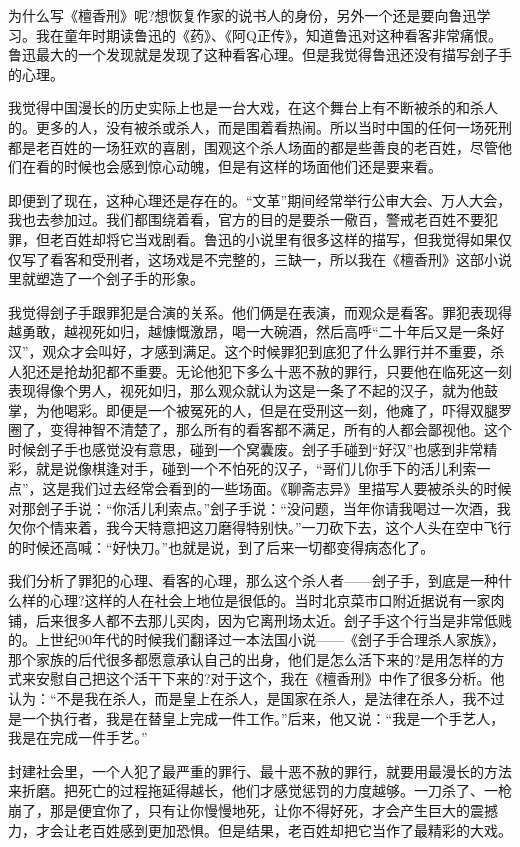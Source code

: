 \documentclass[fontset=fandol,12pt,a5paper]{ctexbook}
\begin{document}
为什么写《檀香刑》呢?想恢复作家的说书人的身份，另外一个还是要向鲁迅学习。我在童年时期读鲁迅的《药》、《阿Q正传》，知道鲁迅对这种看客非常痛恨。鲁迅最大的一个发现就是发现了这种看客心理。但是我觉得鲁迅还没有描写刽子手的心理。

我觉得中国漫长的历史实际上也是一台大戏，在这个舞台上有不断被杀的和杀人的。更多的人，没有被杀或杀人，而是围着看热闹。所以当时中国的任何一场死刑都是老百姓的一场狂欢的喜剧，围观这个杀人场面的都是些善良的老百姓，尽管他们在看的时候也会感到惊心动魄，但是有这样的场面他们还是要来看。

即便到了现在，这种心理还是存在的。“文革”期间经常举行公审大会、万人大会，我也去参加过。我们都围绕着看，官方的目的是要杀一儆百，警戒老百姓不要犯罪，但老百姓却将它当戏剧看。鲁迅的小说里有很多这样的描写，但我觉得如果仅仅写了看客和受刑者，这场戏是不完整的，三缺一，所以我在《檀香刑》这部小说里就塑造了一个刽子手的形象。

我觉得刽子手跟罪犯是合演的关系。他们俩是在表演，而观众是看客。罪犯表现得越勇敢，越视死如归，越慷慨激昂，喝一大碗酒，然后高呼“二十年后又是一条好汉”，观众才会叫好，才感到满足。这个时候罪犯到底犯了什么罪行并不重要，杀人犯还是抢劫犯都不重要。无论他犯下多么十恶不赦的罪行，只要他在临死这一刻表现得像个男人，视死如归，那么观众就认为这是一条了不起的汉子，就为他鼓掌，为他喝彩。即便是一个被冤死的人，但是在受刑这一刻，他瘫了，吓得双腿罗圈了，变得神智不清楚了，那么所有的看客都不满足，所有的人都会鄙视他。这个时候刽子手也感觉没有意思，碰到一个窝囊废。刽子手碰到“好汉”也感到非常精彩，就是说像棋逢对手，碰到一个不怕死的汉子，“哥们儿你手下的活儿利索一点”，这是我们过去经常会看到的一些场面。《聊斋志异》里描写人要被杀头的时候对那刽子手说：“你活儿利索点。”刽子手说：“没问题，当年你请我喝过一次酒，我欠你个情来着，我今天特意把这刀磨得特别快。”一刀砍下去，这个人头在空中飞行的时候还高喊：“好快刀。”也就是说，到了后来一切都变得病态化了。

我们分析了罪犯的心理、看客的心理，那么这个杀人者——刽子手，到底是一种什么样的心理?这样的人在社会上地位是很低的。当时北京菜市口附近据说有一家肉铺，后来很多人都不去那儿买肉，因为它离刑场太近。刽子手这个行当是非常低贱的。上世纪90年代的时候我们翻译过一本法国小说——《刽子手合理杀人家族》，那个家族的后代很多都愿意承认自己的出身，他们是怎么活下来的?是用怎样的方式来安慰自己把这个活干下来的?对于这个，我在《檀香刑》中作了很多分析。他认为：“不是我在杀人，而是皇上在杀人，是国家在杀人，是法律在杀人，我不过是一个执行者，我是在替皇上完成一件工作。”后来，他又说：“我是一个手艺人，我是在完成一件手艺。”

封建社会里，一个人犯了最严重的罪行、最十恶不赦的罪行，就要用最漫长的方法来折磨。把死亡的过程拖延得越长，他们才感觉惩罚的力度越够。一刀杀了、一枪崩了，那是便宜你了，只有让你慢慢地死，让你不得好死，才会产生巨大的震撼力，才会让老百姓感到更加恐惧。但是结果，老百姓却把它当作了最精彩的大戏。
\end{document}
